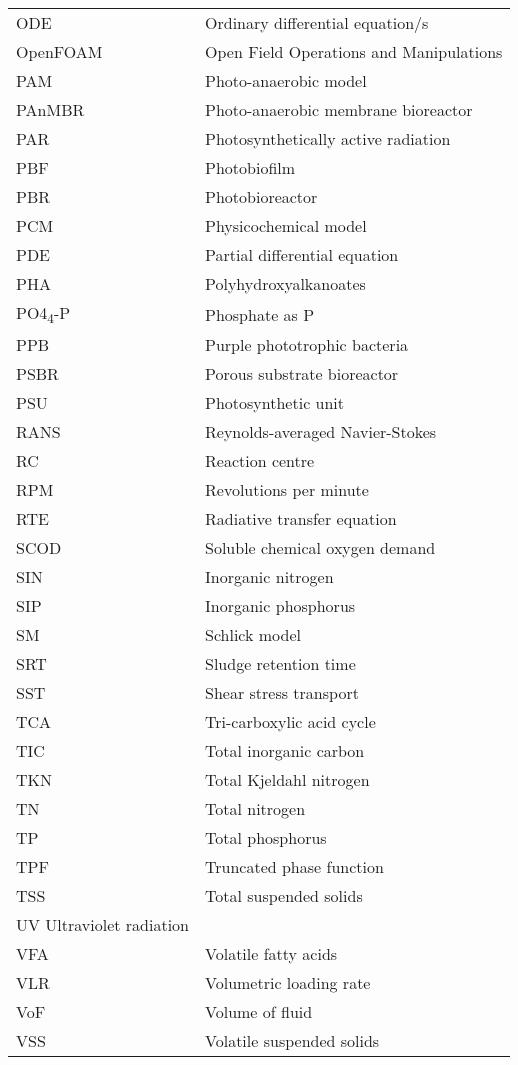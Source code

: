 \begin{center}
\begin{longtable}{ll}
ODE	&	Ordinary differential equation/s	\\
OpenFOAM	&	Open Field Operations and Manipulations	\\
PAM	&	Photo-anaerobic model	\\
PAnMBR	&	Photo-anaerobic membrane bioreactor	\\
PAR	&	Photosynthetically active radiation	\\
PBF	&	Photobiofilm	\\
PBR	&	Photobioreactor	\\
PCM	&	Physicochemical model	\\
PDE	&	Partial differential equation	\\
PHA	&	Polyhydroxyalkanoates	\\
PO4\textsubscript{4}-P	&	Phosphate as P	\\
PPB	&	Purple phototrophic bacteria	\\
PSBR	&	Porous substrate bioreactor	\\
PSU	&	Photosynthetic unit	\\
RANS	&	Reynolds-averaged Navier-Stokes	\\
RC	&	Reaction centre	\\
RPM	&	Revolutions per minute	\\
RTE	&	Radiative transfer equation	\\
SCOD	&	Soluble chemical oxygen demand	\\
SIN	&	Inorganic nitrogen	\\
SIP	&	Inorganic phosphorus	\\
SM	&	Schlick model	\\
SRT	&	Sludge retention time	\\
SST	&	Shear stress transport	\\
TCA	&	Tri-carboxylic acid cycle	\\
TIC	&	Total inorganic carbon	\\
TKN	&	Total Kjeldahl nitrogen	\\
TN	&	Total nitrogen	\\
TP	&	Total phosphorus	\\
TPF	&	Truncated phase function	\\
TSS	&	Total suspended solids	\\
UV		Ultraviolet radiation	\\
VFA	&	Volatile fatty acids	\\
VLR	&	Volumetric loading rate	\\
VoF	&	Volume of fluid	\\
VSS	&	Volatile suspended solids	\\
	\hline
	\end{longtable}
\end{center}

